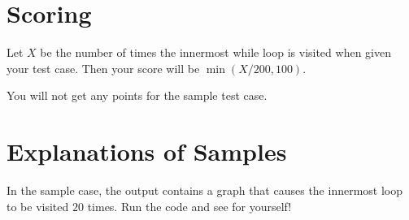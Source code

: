 \section*{Scoring}
Let $X$ be the number of times the innermost while loop is visited when given your test case.
Then your score will be $\min(X / 200, 100)$.

You will not get any points for the sample test case.

\section*{Explanations of Samples}
In the sample case, the output contains a graph that causes the innermost loop to be visited $20$
times. Run the code and see for yourself!
